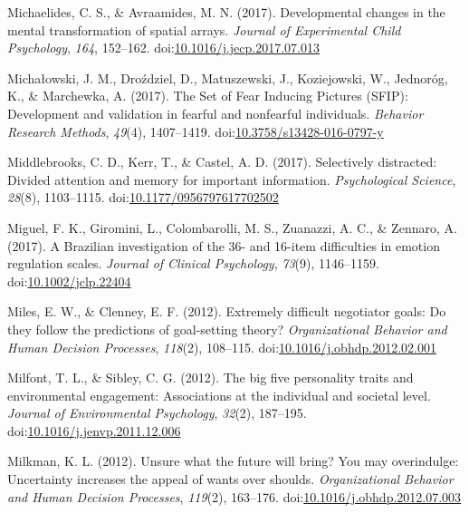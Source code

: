 \documentclass[english,man]{apa6}
\theoremstyle{definition}
\theoremstyle{definition}
\theoremstyle{definition}
\theoremstyle{remark}
\begin{document}
\hypertarget{ref-Michaelides2017}{}
Michaelides, C. S., \& Avraamides, M. N. (2017). Developmental changes
in the mental transformation of spatial arrays. \emph{Journal of
Experimental Child Psychology}, \emph{164}, 152--162.
doi:\href{https://doi.org/10.1016/j.jecp.2017.07.013}{10.1016/j.jecp.2017.07.013}

\hypertarget{ref-Michaowski2016}{}
Michałowski, J. M., Droździel, D., Matuszewski, J., Koziejowski, W.,
Jednoróg, K., \& Marchewka, A. (2017). The Set of Fear Inducing Pictures
(SFIP): Development and validation in fearful and nonfearful
individuals. \emph{Behavior Research Methods}, \emph{49}(4), 1407--1419.
doi:\href{https://doi.org/10.3758/s13428-016-0797-y}{10.3758/s13428-016-0797-y}

\hypertarget{ref-Middlebrooks2017}{}
Middlebrooks, C. D., Kerr, T., \& Castel, A. D. (2017). Selectively
distracted: Divided attention and memory for important information.
\emph{Psychological Science}, \emph{28}(8), 1103--1115.
doi:\href{https://doi.org/10.1177/0956797617702502}{10.1177/0956797617702502}

\hypertarget{ref-Miguel2017}{}
Miguel, F. K., Giromini, L., Colombarolli, M. S., Zuanazzi, A. C., \&
Zennaro, A. (2017). A Brazilian investigation of the 36- and 16-item
difficulties in emotion regulation scales. \emph{Journal of Clinical
Psychology}, \emph{73}(9), 1146--1159.
doi:\href{https://doi.org/10.1002/jclp.22404}{10.1002/jclp.22404}

\hypertarget{ref-Miles2012}{}
Miles, E. W., \& Clenney, E. F. (2012). Extremely difficult negotiator
goals: Do they follow the predictions of goal-setting theory?
\emph{Organizational Behavior and Human Decision Processes},
\emph{118}(2), 108--115.
doi:\href{https://doi.org/10.1016/j.obhdp.2012.02.001}{10.1016/j.obhdp.2012.02.001}

\hypertarget{ref-Milfont2012}{}
Milfont, T. L., \& Sibley, C. G. (2012). The big five personality traits
and environmental engagement: Associations at the individual and
societal level. \emph{Journal of Environmental Psychology},
\emph{32}(2), 187--195.
doi:\href{https://doi.org/10.1016/j.jenvp.2011.12.006}{10.1016/j.jenvp.2011.12.006}

\hypertarget{ref-Milkman2012}{}
Milkman, K. L. (2012). Unsure what the future will bring? You may
overindulge: Uncertainty increases the appeal of wants over shoulds.
\emph{Organizational Behavior and Human Decision Processes},
\emph{119}(2), 163--176.
doi:\href{https://doi.org/10.1016/j.obhdp.2012.07.003}{10.1016/j.obhdp.2012.07.003}
\end{document}
